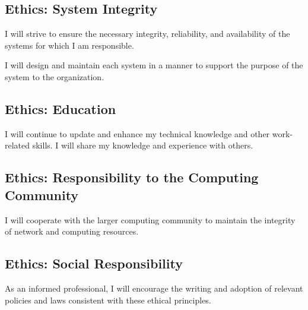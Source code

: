 \documentclass[xga]{xdvislides}
\begin{document}
\subsection{Ethics: System Integrity}
\vfill
\begin{center}
I will strive to ensure the necessary integrity, reliability, and
availability of the systems for which I am responsible. \\
\vspace{.5in}

I will design and maintain each system in a manner to support the
purpose of the system to the organization.
\end{center}
\vfill

\subsection{Ethics: Education}
\vfill
\begin{center}
I will continue to update and enhance my technical knowledge and other
work-related skills. I will share my knowledge and experience with others.
\end{center}
\vfill

\subsection{Ethics: Responsibility to the Computing Community}
\vfill
\begin{center}
I will cooperate with the larger computing community to maintain the
integrity of network and computing resources.
\end{center}
\vfill

\subsection{Ethics: Social Responsibility}
\vfill
\begin{center}
As an informed professional, I will encourage the writing and adoption of
relevant policies and laws consistent with these ethical principles.
\end{center}
\vfill
\end{document}
